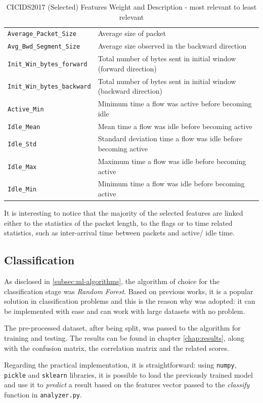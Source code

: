 \begin{table}[h!]
\begin{tabular}{l|l}
        \rowcolor{black!10} \texttt{Average\_Packet\_Size} & Average size of packet \\
        \texttt{Avg\_Bwd\_Segment\_Size} & Average size observed in the backward direction \\
        \rowcolor{black!10} \texttt{Init\_Win\_bytes\_forward} & Total number of bytes sent in initial window (forward direction) \\
        \texttt{Init\_Win\_bytes\_backward} & Total number of bytes sent in initial window (backward direction) \\
        \rowcolor{black!10} \texttt{Active\_Min} & Minimum time a flow was active before becoming idle \\
        \texttt{Idle\_Mean} & Mean time a flow was idle before becoming active \\
        \rowcolor{black!10} \texttt{Idle\_Std} & Standard deviation time a flow was idle before becoming active \\
        \texttt{Idle\_Max} & Maximum time a flow was idle before becoming active \\
        \rowcolor{black!10} \texttt{Idle\_Min} & Minimum time a flow was idle before becoming active \\
        \bottomrule
    \end{tabular}
    \caption{CICIDS2017 (Selected) Features Weight and Description - most relevant to least relevant}
    \label{tab:features-weight}
\end{table}

\noindent It is interesting to notice that the majority of the selected features are linked either to the statistics of the packet length, to the flags or to time related statistics, such as inter-arrival time between packets and active/ idle time.


\subsection{Classification}
\label{subsec:classification}

As disclosed in \ref{subsec:ml-algorithms}, the algorithm of choice for the classification stage was \textit{Random Forest}. Based on previous works, it is a popular solution in classification problems and this is the reason why was adopted: it can be implemented with ease and can work with large datasets with no problem.
\par The pre-processed dataset, after being split, was passed to the algorithm for training and testing. The results can be found in chapter \ref{chap:results}, along with the confusion matrix, the correlation matrix and the related scores.
\par Regarding the practical implementation, it is straightforward: using \texttt{numpy}, \texttt{pickle} and \texttt{sklearn} libraries, it is possible to load the previously trained model and use it to \textit{predict} a result based on the features vector passed to the \textit{classify} function in \texttt{analyzer.py}.


